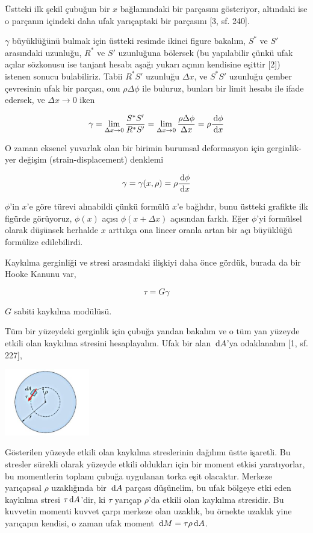 \documentclass[12pt,fleqn]{article}\usepackage{../../common}
\begin{document}
Üstteki ilk şekil çubuğun bir $x$ bağlamındaki bir parçasını gösteriyor,
altındaki ise o parçanın içindeki daha ufak yarıçaptaki bir parçasını [3, sf. 240]. 

$\gamma$ büyüklüğünü bulmak için üstteki resimde ikinci figure bakalım, $S^*$ ve
$S'$ arasındaki uzunluğu, $R^*$ ve $S'$ uzunluğuna bölersek (bu yapılabilir
çünkü ufak açılar sözkonusu ise tanjant hesabı aşağı yukarı açının kendisine
eşittir [2]) istenen sonucu bulabiliriz. Tabii $R^*S'$ uzunluğu $\Delta x$,
ve $S^*S'$ uzunluğu çember çevresinin ufak bir parçası, onu  $\rho \Delta \phi$
ile buluruz, bunları bir limit hesabı ile ifade edersek, ve $\Delta x \to 0$
iken

$$
\gamma = \lim_{\Delta x \to 0} \frac{S^*S'}{R^*S'} =
\lim_{\Delta x \to 0} \frac{\rho \Delta \phi}{\Delta x} =
\rho \frac{\,\mathrm{d} \phi}{\,\mathrm{d} x}
$$

O zaman eksenel yuvarlak olan bir birimin burumsal deformasyon için
gerginlik-yer değişim (strain-displacement) denklemi

$$
\gamma = \gamma(x,\rho) = \rho \frac{\,\mathrm{d} \phi}{\,\mathrm{d} x}
$$

$\phi$'in $x$'e göre türevi alınabildi çünkü formülü $x$'e bağlıdır, bunu
üstteki grafikte ilk figürde görüyoruz, $\phi(x)$ açısı $\phi(x+\Delta x)$
açısından farklı. Eğer $\phi$'yi formülsel olarak düşünsek herhalde $x$ arttıkça
ona lineer oranla artan bir açı büyüklüğü formülize edilebilirdi.

Kaykılma gerginliği ve stresi arasındaki ilişkiyi daha önce gördük, burada da
bir Hooke Kanunu var,

$$
\tau = G \gamma
$$

$G$ sabiti kaykılma modülüsü. 

Tüm bir yüzeydeki gerginlik için çubuğa yandan bakalım ve o tüm yan yüzeyde
etkili olan kaykılma stresini hesaplayalım. Ufak bir alan $\,\mathrm{d} A$'ya
odaklanalım [1, sf. 227],

\includegraphics[width=10em]{phy_020_strs_06_04.jpg}

Gösterilen yüzeyde etkili olan kaykılma streslerinin dağılımı üstte işaretli. Bu
stresler sürekli olarak yüzeyde etkili oldukları için bir moment etkisi
yaratıyorlar, bu momentlerin toplamı çubuğa uygulanan torka eşit
olacaktır. Merkeze yarıçapsal $\rho$ uzaklığında bir $\,\mathrm{d} A$ parçası düşünelim,
bu ufak bölgeye etki eden kaykılma stresi $\tau \,\mathrm{d} A$'dir, ki $\tau$ yarıçap
$\rho$'da etkili olan kaykılma stresidir. Bu kuvvetin momenti kuvvet çarpı
merkeze olan uzaklık, bu örnekte uzaklık yine yarıçapın kendisi, o zaman ufak
moment $\,\mathrm{d} M = \tau \rho \,\mathrm{d} A$.
\end{document}
